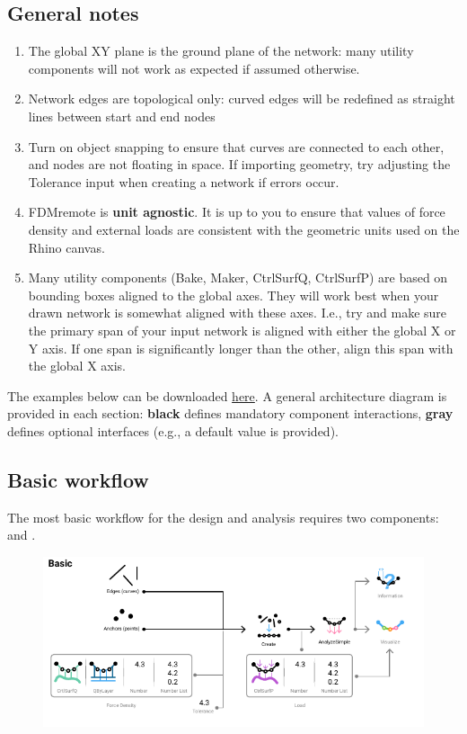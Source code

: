 \subsection{General notes}
\begin{enumerate}
    \item The global XY plane is the ground plane of the network: many utility components will not work as expected if assumed otherwise.
    \item Network edges are topological only: curved edges will be redefined as straight lines between start and end nodes
    \item Turn on object snapping to ensure that curves are connected to each other, and nodes are not floating in space. If importing geometry, try adjusting the Tolerance input when creating a network if errors occur.
    \item FDMremote is \textbf{unit agnostic}. It is up to you to ensure that values of force density and external loads are consistent with the geometric units used on the Rhino canvas.
    \item Many utility components (Bake, Maker, CtrlSurfQ, CtrlSurfP) are based on bounding boxes aligned to the global axes. They will work best when your drawn network is somewhat aligned with these axes. I.e., try and make sure the primary span of your input network is aligned with either the global X or Y axis. If one span is significantly longer than the other, align this span with the global X axis.
\end{enumerate}

The examples below can be downloaded \href{https://www.food4rhino.com/en/app/fdmremote?lang=en}{here}. A general architecture diagram is provided in each section: \textbf{black} defines mandatory component interactions, {\color{gray} \textbf{gray}} defines optional interfaces (e.g., a default value is provided).

\subsection{Basic workflow}
The most basic workflow for the design and analysis requires two components:  and .

\begin{figure}[h]
    \centering
    \includegraphics*[width=\textwidth]{Figures/basic}
\end{figure}

